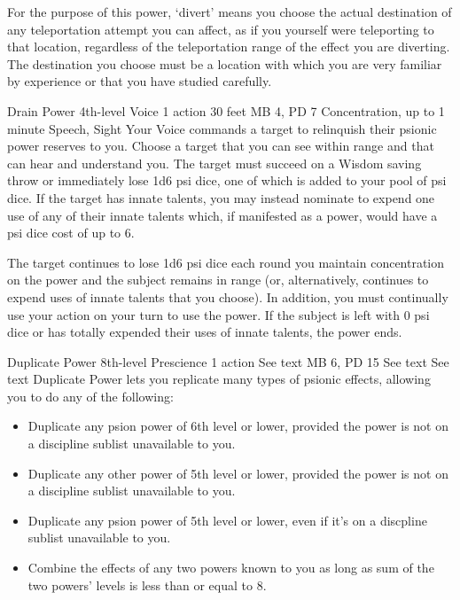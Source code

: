 For the purpose of this power, `divert' means you choose
the actual destination of any teleportation attempt you can
affect, as if you yourself were teleporting to that location,
regardless of the teleportation range of the effect you are
diverting. The destination you choose must be a location with
which you are very familiar by experience or that you have
studied carefully.

\DndPowerHeader%
    {Drain Power\label{pwr:drain-power}}
    {4th-level Voice}
    {1 action}
    {30 feet}
    {MB 4, PD 7}
    {Concentration, up to 1 minute}
    {Speech, Sight}
Your Voice commands a target to relinquish
their psionic power reserves to you. Choose a target that
you can see within range
and that can hear and understand you.
The target must succeed on a Wisdom
saving throw or immediately lose 1d6 psi dice, one of which
is added to your pool of psi dice. If the target has innate
talents, you may instead nominate to expend one use of any
of their innate talents which,
if manifested as a power,
would have a psi dice cost of up to 6.

The target continues to lose 1d6 psi dice each round you maintain
concentration on the power and the subject remains in range
(or, alternatively, continues to expend uses of innate talents
that you choose). In addition, you must continually use your
action on your turn to use the power. If the subject is left
with 0 psi dice or has totally expended their uses of innate
talents, the power ends.

\DndPowerHeader%
    {Duplicate Power\label{pwr:duplicate-power}}
    {8th-level Prescience}
    {1 action}
    {See text}
    {MB 6, PD 15}
    {See text}
    {See text}
Duplicate Power lets you replicate many types of psionic effects,
allowing you to do any of the following:
\begin{itemize}
\item Duplicate any psion power of 6th level or lower,
      provided the power is not on a discipline sublist unavailable to you.
\item Duplicate any other power of 5th level or lower,
      provided the power is not on a discipline sublist unavailable to you.
\item Duplicate any psion power of 5th level or lower,
      even if it's on a discpline sublist unavailable to you.
\item Combine the effects of any two powers known to you
      as long as sum of the two powers' levels is less than or equal to 8.
\end{itemize}

